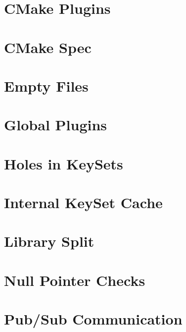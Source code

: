 \documentclass[twoside]{book}
\newcommand{\+}{\discretionary{\mbox{\scriptsize$\hookleftarrow$}}{}{}}
\begin{document}
\chapter{C\+Make Plugins}
\label{doc_decisions_cmake_plugins_md}
\hypertarget{doc_decisions_cmake_plugins_md}{}

\chapter{C\+Make Spec}
\label{doc_decisions_cmake_spec_md}
\hypertarget{doc_decisions_cmake_spec_md}{}

\chapter{Empty Files}
\label{doc_decisions_empty_files_md}
\hypertarget{doc_decisions_empty_files_md}{}

\chapter{Global Plugins}
\label{doc_decisions_global_plugins_md}
\hypertarget{doc_decisions_global_plugins_md}{}

\chapter{Holes in Key\+Sets}
\label{doc_decisions_holes_md}
\hypertarget{doc_decisions_holes_md}{}

\chapter{Internal Key\+Set Cache}
\label{doc_decisions_internal_cache_md}
\hypertarget{doc_decisions_internal_cache_md}{}

\chapter{Library Split}
\label{doc_decisions_library_split_md}
\hypertarget{doc_decisions_library_split_md}{}

\chapter{Null Pointer Checks}
\label{doc_decisions_null_pointer_checks_md}
\hypertarget{doc_decisions_null_pointer_checks_md}{}

\chapter{Pub/\+Sub Communication}
\label{doc_decisions_pubsub_md}
\hypertarget{doc_decisions_pubsub_md}{}

\end{document}

